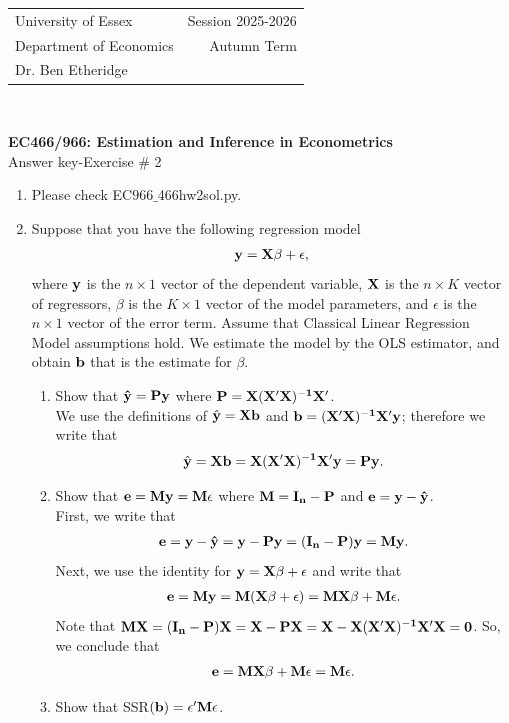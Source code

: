 \documentclass[12pt,a4paper]{article}
\begin{document}
\begin{tabular}{l r}
University of Essex  \hspace{35ex}& Session 2025-2026 \\
Department of Economics \hspace{35ex} & Autumn Term\\
Dr. Ben Etheridge \hspace{35ex} &
\end{tabular}
\\
\begin{center}
\large{\textbf{EC466/966: Estimation and Inference in Econometrics}\\
Answer key-Exercise \# 2}
\end{center}

\begin{enumerate}
\item{Please check EC$966\_$466hw2sol.py.}
\item{Suppose that you have the following regression model}
\begin{align*}
{\bf y}={\bf X}\beta +\epsilon,
\end{align*}
where ${\bf y}$ is the $n \times 1$ vector of the dependent variable, ${\bf X}$ is the $n \times K$ vector of regressors, $\beta$ is the $K \times 1$ vector of the model parameters, and $\epsilon$ is the $n \times 1$ vector of the error term. Assume that Classical Linear Regression Model assumptions hold. We estimate the model by the OLS estimator, and obtain ${\bf b}$ that is the estimate for $\beta$.
\begin{enumerate}
\item{Show that ${\bf \hat{y}}={\bf P y}$ where ${\bf P=X(X'X)^{-1}X'}$.}\\

We use the definitions of $\hat{{\bf y}}={\bf Xb}$ and ${\bf b=(X'X)^{-1}X'y}$; therefore we write that
\begin{align*}
\hat{{\bf y}}={\bf Xb}={\bf X(X'X)^{-1}X'y=Py}.
\end{align*}
\item{Show that ${\bf e=My=M\epsilon}$ where ${\bf M=I_{n}-P}$ and ${\bf e=y-\hat{y}}$.}\\

First, we write that 
\begin{align*}
{\bf e}={\bf y}-{\bf \hat{y}}={\bf y}-{\bf Py}=({\bf I_{n}}-{\bf P}){\bf y}={\bf My}.
\end{align*}
Next, we use the identity for ${\bf y=X\beta}+\epsilon$ and write that
\begin{align*}
{\bf e}={\bf My}={\bf M}({\bf X\beta}+\epsilon)={\bf MX}\beta+{\bf M}\epsilon.
\end{align*}
Note that ${\bf MX}={\bf (I_{n}-P)X}={\bf X-PX}={\bf X-X(X'X)^{-1}X'X}={\bf 0}$. So, we conclude that
\begin{align*}
{\bf e}={\bf MX}\beta+{\bf M\epsilon}={\bf M}\epsilon.
\end{align*}
\item{Show that SSR$({\bf b})=\epsilon'{\bf M}\epsilon$.}\\


\end{enumerate}
\end{enumerate}
\end{document}
